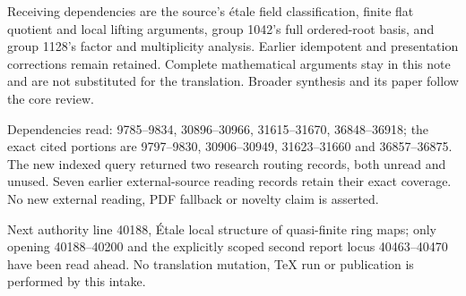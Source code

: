 Receiving dependencies are the source's étale field classification, finite flat quotient and local lifting arguments, group 1042's full ordered-root basis, and group 1128's factor and multiplicity analysis. Earlier idempotent and presentation corrections remain retained. Complete mathematical arguments stay in this note and are not substituted for the translation. Broader synthesis and its paper follow the core review.

Dependencies read: 9785--9834, 30896--30966, 31615--31670, 36848--36918; the exact cited portions are 9797--9830, 30906--30949, 31623--31660 and 36857--36875. The new indexed query returned two research routing records, both unread and unused. Seven earlier external-source reading records retain their exact coverage. No new external reading, PDF fallback or novelty claim is asserted.

Next authority line 40188, Étale local structure of quasi-finite ring maps; only opening 40188--40200 and the explicitly scoped second report locus 40463--40470 have been read ahead. No translation mutation, TeX run or publication is performed by this intake.
